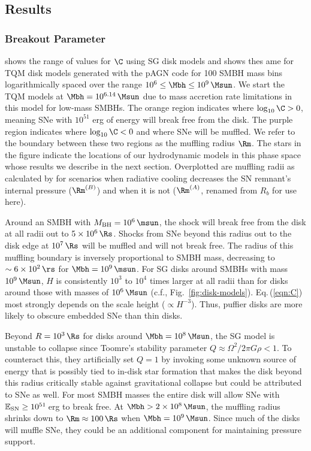 
\subsection{Results} \label{sec:results-ch3}

\subsubsection{Breakout Parameter}
 shows the range of values for $\C$ using SG disk models and  shows thes ame for TQM disk models generated with the pAGN code for 100 SMBH mass bins logarithmically spaced over the range $10^6 \leq \Mbh \leq 10^9\,\Msun$.
We start the TQM models at $\Mbh=10^{6.14}\,\Msun$ due to mass accretion rate limitations in this model for low-mass SMBHs.
The orange region indicates where $\log_{10}\C>0$, meaning SNe with $10^{51}$ erg of energy will break free from the disk.
The purple region indicates where $\log_{10}\C<0$ and where SNe will be muffled.
We refer to the boundary between these two regions as the muffling radius $\Rm$.
The stars in the figure indicate the locations of our hydrodynamic models in this phase space whose results we describe in the next section.
Overplotted are muffling radii as calculated by \citet{Moranchel+21} for scenarios when radiative cooling decreases the SN remnant's internal pressure ($\Rm^{(B)}$) and when it is not ($\Rm^{(A)}$, renamed from $R_b$ for use here).

Around an SMBH with $M_{\rm BH}=10^6\,\msun$, the shock will break free from the disk at all radii out to $5\times10^6\,\Rs$.
Shocks from SNe beyond this radius out to the disk edge at $10^7\,\Rs$ will be muffled and will not break free.
The radius of this muffling boundary is inversely proportional to SMBH mass, decreasing to $\sim 6\times10^2\,\rs$ for $\Mbh=10^9\,\msun$.
For SG disks around SMBHs with mass $10^9\,\Msun$, $H$ is consistently $10^3$ to $10^4$ times larger at all radii than for disks around those with masses of $10^6\,\Msun$ (c.f., Fig.~\ref{fig:disk-models}).
Eq.\,(\ref{eqn:C}) most strongly depends on the scale height ($\propto H^{-3}$).
Thus, puffier disks are more likely to obscure embedded SNe than thin disks.

Beyond $R=10^3\,\Rs$ for disks around $\Mbh=10^8\,\Msun$, the SG model is unstable to collapse since Toomre's stability parameter $Q\approx\Omega^2/2\pi G\rho < 1$.
To counteract this, they artificially set $Q=1$ by invoking some unknown source of energy that is possibly tied to in-disk star formation that makes the disk beyond this radius critically stable against gravitational collapse but could be attributed to SNe as well.
For most SMBH masses the entire disk will allow SNe with $\mathbb{E}_{\rm SN}\geq10^{51}$\,erg to break free.
At $\Mbh> 2\times10^8\,\Msun$, the muffling radius shrinks down to $\Rm\approx100\,\Rs$ when $\Mbh=10^9\,\Msun$.
Since much of the disks will muffle SNe, they could be an additional component for maintaining pressure support.

